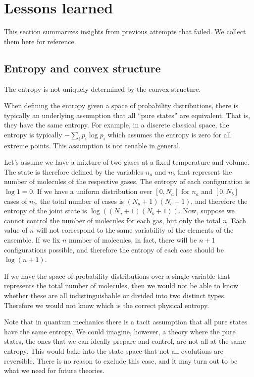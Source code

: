 \section{Lessons learned}

This section summarizes insights from previous attempts that failed. We collect them here for reference.

\subsection{Entropy and convex structure}

\begin{insight}
	The entropy is not uniquely determined by the convex structure.
\end{insight}

When defining the entropy given a space of probability distributions, there is typically an underlying assumption that all ``pure states'' are equivalent. That is, they have the same entropy. For example, in a discrete classical space, the entropy is typically $-\sum_i p_i \log p_i$ which assumes the entropy is zero for all extreme points. This assumption is not tenable in general.

\begin{example}
	Let's assume we have a mixture of two gases at a fixed temperature and volume. The state is therefore defined by the variables $n_a$ and $n_b$ that represent the number of molecules of the respective gases. The entropy of each configuration is $\log 1 = 0$. If we have a uniform distribution over $[0,N_a]$ for $n_a$ and $[0,N_b]$ cases of $n_b$, the total number of cases is $(N_a + 1) (N_b + 1)$, and therefore the entropy of the joint state is $\log ((N_a + 1) (N_b + 1))$. Now, suppose we cannot control the number of molecules for each gas, but only the total $n$. Each value of $n$ will not correspond to the same variability of the elements of the ensemble. If we fix $n$ number of molecules, in fact, there will be $n+1$ configurations possible, and therefore the entropy of each case should be $\log (n+1)$.
	
	If we have the space of probability distributions over a single variable that represents the total number of molecules, then we would not be able to know whether these are all indistinguishable or divided into two distinct types. Therefore we would not know which is the correct physical entropy.
\end{example}

Note that in quantum mechanics there is a tacit assumption that all pure states have the same entropy. We could imagine, however, a theory where the pure states, the ones that we can ideally prepare and control, are not all at the same entropy. This would bake into the state space that not all evolutions are reversible. There is no reason to exclude this case, and it may turn out to be what we need for future theories.

